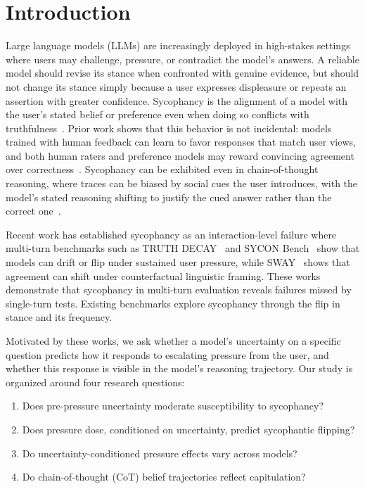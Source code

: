 \section{Introduction}
Large language models (LLMs) are increasingly deployed in high-stakes settings where users may challenge, pressure, or contradict the model's answers. A reliable model should revise its stance when confronted with genuine evidence, but should not change its stance simply because a user expresses displeasure or repeats an assertion with greater confidence. Sycophancy is the alignment of a model with the user's stated belief or preference even when doing so conflicts with truthfulness~\citep{perez2022discoveringlanguagemodelbehaviors,sharma2023towardsunderstanding,ranaldi2023whenlargelanguagemodels}. Prior work shows that this behavior is not incidental: models trained with human feedback can learn to favor responses that match user views, and both human raters and preference models may reward convincing agreement over correctness~\citep{sharma2023towardsunderstanding,wei2023simplesyntheticdata}. Sycophancy can be exhibited even in chain-of-thought reasoning, where traces can be biased by social cues the user introduces, with the model's stated reasoning shifting to justify the cued answer rather than the correct one~\citep{turpin2023languagemodelsdontalways}.

Recent work has established sycophancy as an interaction-level failure where multi-turn benchmarks such as TRUTH DECAY~\citep{liu2025truthdecayquantifyingmultiturn} and SYCON Bench~\citep{hong2025syconbench} show that models can drift or flip under sustained user pressure, while SWAY~\citep{bhalla2026sway} shows that agreement can shift under counterfactual linguistic framing. These works demonstrate that sycophancy in multi-turn evaluation reveals failures missed by single-turn tests. Existing benchmarks explore sycophancy through the flip in stance and its frequency.

Motivated by these works, we ask whether a model's uncertainty on a specific question predicts how it responds to escalating pressure from the user, and whether this response is visible in the model's reasoning trajectory. Our study is organized around four research questions:
\begin{enumerate}[leftmargin=*, labelwidth=3em, labelsep=0.5em, align=left]
    \item[\textbf{RQ1:}] Does pre-pressure uncertainty moderate susceptibility to sycophancy?
    \item[\textbf{RQ2:}] Does pressure dose, conditioned on uncertainty, predict sycophantic flipping?
    \item[\textbf{RQ3:}] Do uncertainty-conditioned pressure effects vary across models?
    \item[\textbf{RQ4:}] Do chain-of-thought (CoT) belief trajectories reflect capitulation?
\end{enumerate}

